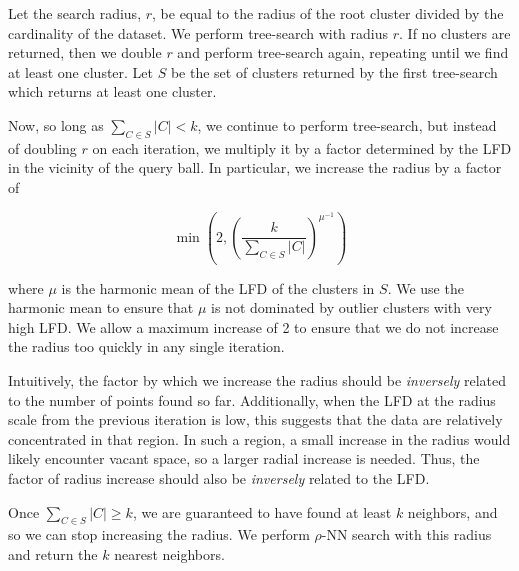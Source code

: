 Let the search radius, $r$, be equal to the radius of the root cluster divided by the cardinality of the dataset.
We perform tree-search with radius $r$.
If no clusters are returned, then we double $r$ and perform tree-search again, repeating until we find at least one cluster.
Let $S$ be the set of clusters returned by the first tree-search which returns at least one cluster.

Now, so long as $\sum_{C \in S} |C| < k$, we continue to perform tree-search, but instead of doubling $r$ on each iteration, we multiply it by a factor determined by the LFD in the vicinity of the query ball. 
In particular, we increase the radius by a factor of

\begin{equation}
    \min \left(2, \left( {\frac{k}{\sum_{C \in S} |C|}} \right)^{\mu^{-1}} \right)
    \label{eq:methods:repeated-rnn-factor}
\end{equation}

where $\mu$ is the harmonic mean of the LFD of the clusters in $S$.
We use the harmonic mean to ensure that $\mu$ is not dominated by outlier clusters with very high LFD.
We allow a maximum increase of 2 to ensure that we do not increase the radius too quickly in any single iteration.

Intuitively, the factor by which we increase the radius should be \emph{inversely} related to the number of points found so far. 
Additionally, when the LFD at the radius scale from the previous iteration is low, this suggests that the data are relatively concentrated in that region.
In such a region, a small increase in the radius would likely encounter vacant space, so a larger radial increase is needed.
Thus, the factor of radius increase should also be \emph{inversely} related to the LFD.

Once $\sum_{C \in S} |C| \geq k$, we are guaranteed to have found at least $k$ neighbors, and so we can stop increasing the radius.
We perform $\rho$-NN search with this radius and return the $k$ nearest neighbors.

